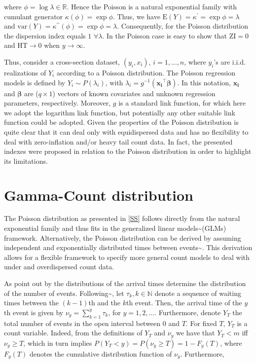 \documentclass[9pt,a5paper,]{book}
\begin{document}
where \(\phi = \log{\lambda} \in \mathbb{R}\). Hence the Poisson is a
natural exponential family with cumulant generator
\(\kappa(\phi) = \exp{\phi}\). Thus, we have
\(\mathrm{E}(Y) = \kappa^{\prime} = \exp{\phi} = \lambda\) and
\(\mathrm{var}(Y) = \kappa^{\prime \prime}(\phi) = \exp{\phi} = \lambda\).
Consequently, for the Poisson distribution the dispersion index equals
\(1\) \(\forall \lambda\). In the Poisson case is easy to show that
\(\mathrm{ZI} = 0\) and \(\mathrm{HT} \to 0\) when \(y \to \infty\).

Thus, consider a cross-section dataset, \((y_i, x_i)\),
\(i = 1,\ldots, n\), where \(y_i\)'s are i.i.d. realizations of \(Y_i\)
according to a Poisson distribution. The Poisson regression models is
defined by \(Y_i \sim P(\lambda_i)\), with
\(\lambda_i = g^{-1}(\boldsymbol{x_i}^{\top} \boldsymbol{\beta})\). In
this notation, \(\boldsymbol{x_i}\) and \(\boldsymbol{\beta}\) are
(\(q \times 1\)) vectors of known covariates and unknown regression
parameters, respectively. Moreover, \(g\) is a standard link function,
for which here we adopt the logarithm link function, but potentially any
other suitable link function could be adopted. Given the properties of
the Poisson distribution is quite clear that it can deal only with
equidispersed data and has no flexibility to deal with zero-inflation
and/or heavy tail count data. In fact, the presented indexes were
proposed in relation to the Poisson distribution in order to highlight
its limitations.

\section{Gamma-Count distribution}\label{gamma-count-distribution}

The Poisson distribution as presented in \ref{SS} follows directly from
the natural exponential family and thus fits in the generalized linear
models\textasciitilde{}(GLMs) framework. Alternatively, the Poisson
distribution can be derived by assuming independent and exponentially
distributed times between events\textasciitilde{}\citet{Zeviani:2014}.
This derivation allows for a flexible framework to specify more general
count models to deal with under and overdispersed count data.

As point out by \citet{Winkelmann:2003} the distributions of the arrival
times determine the distribution of the number of events.
Following\textasciitilde{}\citet{Winkelmann:2003}, let
\({\tau_k, k \in \mathbb{N}}\) denote a sequence of waiting times
between the \((k-1)\)th and the \(k\)th event. Then, the arrival time of
the \(y\)th event is given by \(\nu_y = \sum_{k = 1}^{y} \tau_k\), for
\(y = 1, 2, \ldots\). Furthermore, denote \(Y_T\) the total number of
events in the open interval between \(0\) and \(T\). For fixed \(T\),
\(Y_T\) is a count variable. Indeed, from the definitions of \(Y_T\) and
\(\nu_y\) we have that \(Y_T < m\) iff \(\nu_y \ge T\), which in turn
implies \(P(Y_T < y) = P(\nu_y \ge T) = 1 - F_y(T)\), where \(F_y(T)\)
denotes the cumulative distribution function of \(\nu_y\). Furthermore,
\end{document}
